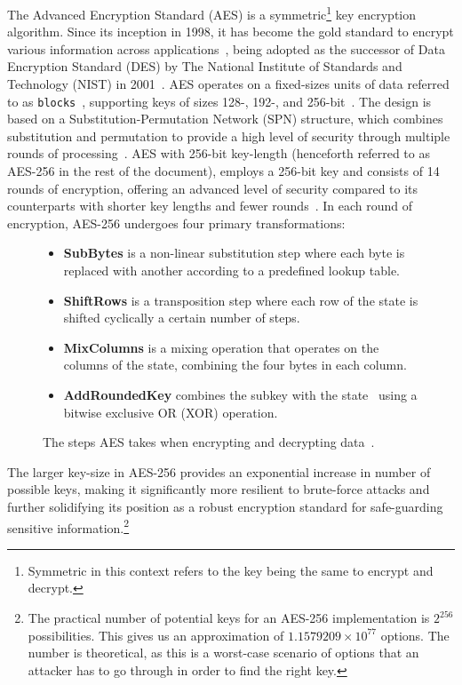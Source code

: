 The Advanced Encryption Standard (AES) is a symmetric\footnote{
  Symmetric in this context refers to the key being the same to encrypt and
  decrypt.
} key encryption algorithm.
Since its inception in 1998, it has become the gold standard to encrypt various
information across applications~\cite{schneier2015applied,rijndael_book}, being adopted as the
successor of Data Encryption Standard (DES) by The National Institute of 
Standards and Technology (NIST) in 2001~\cite{nist_aes_winner}.
AES operates on a fixed-sizes units of data referred to as \texttt{blocks}~\cite{nistfips197blocks},
supporting keys of sizes 128-, 192-, and 256-bit~\cite{nistfips197intro}.
The design is based on a Substitution-Permutation Network (SPN) structure, which
combines substitution and permutation to provide a high level of security
through multiple rounds of processing~\cite{nistfips197specification}.
AES with 256-bit key-length (henceforth referred to as AES-256 in the rest
of the document), employs a 256-bit key and consists of 14 rounds of encryption,
offering an advanced level of security compared to its counterparts with shorter
key lengths and fewer rounds~\cite{nistfips197256}.
In each round of encryption, AES-256 undergoes four primary transformations:
\begin{figure}[htbp]
  \begin{itemize}
    \item \textbf{SubBytes} is a non-linear substitution step where each byte is replaced with
    another according to a predefined lookup table.
    \item \textbf{ShiftRows} is a transposition step where each row of the state
    is shifted cyclically a certain number of steps.
    \item \textbf{MixColumns} is a mixing operation that operates on the columns of the state,
    combining the four bytes in each column.
    \item \textbf{AddRoundedKey} combines the subkey with the state\protect\footnotemark
    ~using a bitwise exclusive OR (XOR) operation.
  \end{itemize}
  \caption{The steps AES takes when encrypting and decrypting data~\cite{nistfips197specification}.}
  \label{fig:aessteps}
\end{figure}
\newline
The larger key-size in AES-256 provides an exponential increase in number of
possible keys, making it significantly more resilient to brute-force attacks
and further solidifying its position as a robust encryption standard for
safe-guarding sensitive information.\footnote{
  The practical number of potential keys for an AES-256 implementation is
  $2^{256}$ possibilities. This gives us an approximation of $1.1579209 \times 10^{77}$
  options.
  The number is theoretical, as this is a worst-case scenario of options that an
  attacker has to go through in order to find the right key.
}

